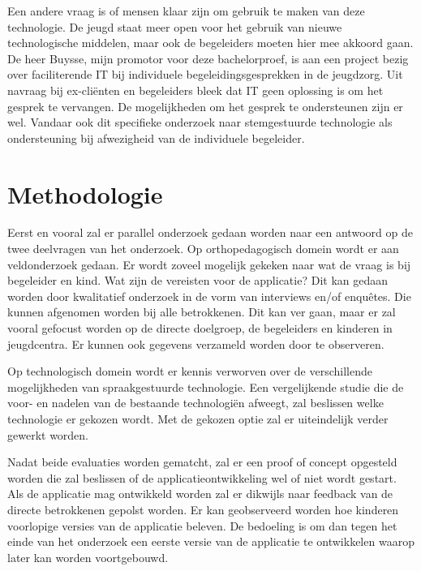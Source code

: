 Een andere vraag is of mensen klaar zijn om gebruik te maken van deze technologie. De jeugd staat meer open voor het gebruik van nieuwe technologische middelen, maar ook de begeleiders moeten hier mee akkoord gaan. De heer Buysse, mijn promotor voor deze bachelorproef, is aan een project bezig over faciliterende IT bij individuele begeleidingsgesprekken in de jeugdzorg. Uit navraag bij ex-cliënten en begeleiders bleek dat IT geen oplossing is om het gesprek te vervangen. De mogelijkheden om het gesprek te ondersteunen zijn er wel. Vandaar ook dit specifieke onderzoek naar stemgestuurde technologie als ondersteuning bij afwezigheid van de individuele begeleider.


\section{Methodologie}
\label{sec:methodologie}
Eerst en vooral zal er parallel onderzoek gedaan worden naar een antwoord op de twee deelvragen van het onderzoek.
Op orthopedagogisch domein wordt er aan veldonderzoek gedaan. Er wordt zoveel mogelijk gekeken naar wat de vraag is bij begeleider en kind. Wat zijn de vereisten voor de applicatie? Dit kan gedaan worden door kwalitatief onderzoek in de vorm van interviews en/of enquêtes. Die kunnen afgenomen worden bij alle betrokkenen. Dit kan ver gaan, maar er zal vooral gefocust worden op de directe doelgroep, de begeleiders en kinderen in jeugdcentra. Er kunnen ook gegevens verzameld worden door te observeren.

Op technologisch domein wordt er kennis verworven over de verschillende mogelijkheden van spraakgestuurde technologie. Een vergelijkende studie die de voor- en nadelen van de bestaande technologiën afweegt, zal beslissen welke technologie er gekozen wordt. Met de gekozen optie zal er uiteindelijk verder gewerkt worden.

Nadat beide evaluaties worden gematcht, zal er een proof of concept opgesteld worden die zal beslissen of de applicatieontwikkeling wel of niet wordt gestart. Als de applicatie mag ontwikkeld worden zal er dikwijls naar feedback van de directe betrokkenen gepolst worden. Er kan geobserveerd worden hoe kinderen voorlopige versies van de applicatie beleven. De bedoeling is om dan tegen het einde van het onderzoek een eerste versie van de applicatie te ontwikkelen waarop later kan worden voortgebouwd.

